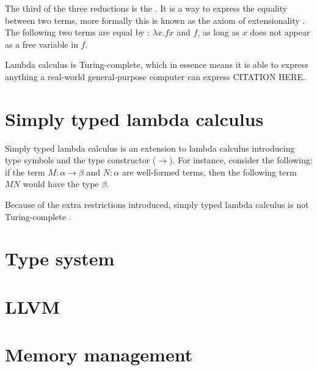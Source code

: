 The third of the three reductions is the \ered{}. It is a way to express the equality between two terms, more formally this is known as the axiom of extensionality \citep{ENDERTON197717}. The following two terms are equal by \ered{}: $\lambda x . f x$ and $f$, as long as $x$ does not appear as a free variable in $f$.
\newline

Lambda calculus is Turing-complete, which in essence means it is able to express anything a real-world general-purpose computer can express CITATION HERE.

\section{Simply typed lambda calculus}

Simply typed lambda calculus is an extension to lambda calculus introducing type symbols and the type constructor ($\rightarrow$)\citep{church_1940}. For instance, consider the following:
if the term $M : \alpha \rightarrow \beta$ and $N : \alpha$ are well-formed terms, then the following term $MN$ would have the type $\beta$.
\newline

Because of the extra restrictions introduced, simply typed lambda calculus is not Turing-complete .


\section{Type system}


\section{LLVM}


\section{Memory management}





